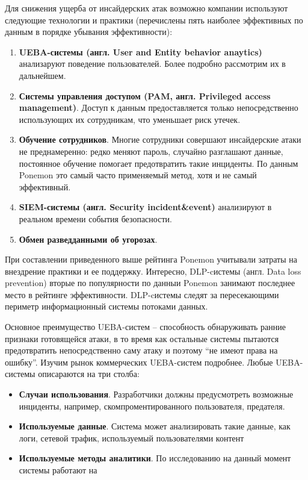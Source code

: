 Для снижения ущерба от инсайдерских атак возможно компании используют следующие технологии и практики (перечислены пять наиболее эффективных по данным\cite{ponemon} в порядке убывания эффективности):
\begin{enumerate}
\item \textbf{UEBA-системы (англ. User and Entity behavior anaytics)} анализаруют поведение пользователей. Более подробно рассмотрим их в дальнейшем.
\item \textbf{Системы управления доступом (PAM,  англ. Privileged access management)}. Доступ к данным предоставляется только непосредственно использующих их сотрудникам, что уменьшает риск утечек.
\item \textbf{Обучение сотрудников}. Многие сотрудники совершают инсайдерские атаки не преднамеренно: редко меняют пароль, случайно разглашают данные, постоянное обучение помогает предотвратить такие инциденты. По данным Ponemon это самый часто применяемый метод, хотя и не самый эффективный. 
\item \textbf{SIEM-системы (англ. Security incident\&event)} анализируют в реальном времени события безопасности.
\item \textbf{Обмен разведданными об угорозах}.
\end{enumerate}
При составлении приведенного выше рейтинга Ponemon учитывали затраты на внездрение практики и ее поддержку.
Интересно, {DLP-cистемы (англ. Data loss prevention)} вторые по популярности по данныи Ponemon занимают последнее место в рейтинге эффективности. DLP-cистемы следят за пересекающими периметр информационный системы потоками данных.

Основное преимущество UEBA-систем -- способность обнаруживать ранние признаки готовящейся атаки, в то время как остальные системы пытаются предотвратить непосредственно саму атаку и поэтому ``не имеют права на ошибку''. Изучим рынок коммерческих UEBA-систем подробнее. Любые UEBA-системы описараются на три столба\cite{gartner}:
\begin{itemize}
\item \textbf{Случаи использования}. Разработчики должны предусмотреть возможные инциденты, например, скомпроментированного пользователя, предателя.
\item \textbf{Используемые данные}. Система может анализировать такие данные, как логи, сетевой трафик, используемый пользователями контент
\item \textbf{Используемые методы аналитики}. По исследованию\cite{gartner} на данный момент системы работают на
\end{itemize}

\clearpage